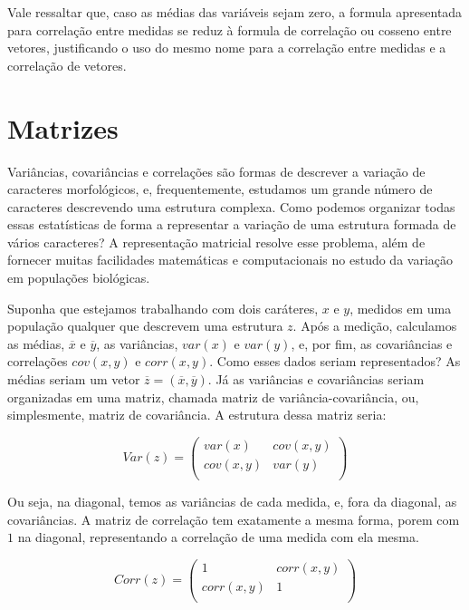 \documentclass[portuges,]{tufte-handout}
\begin{document}
Vale ressaltar que, caso as médias das variáveis sejam zero, a formula
apresentada para correlação entre medidas se reduz à formula de
correlação ou cosseno entre vetores, justificando o uso do mesmo nome
para a correlação entre medidas e a correlação de vetores.

\section{Matrizes}\label{matrizes}

Variâncias, covariâncias e correlações são formas de descrever a
variação de caracteres morfológicos, e, frequentemente, estudamos um
grande número de caracteres descrevendo uma estrutura complexa. Como
podemos organizar todas essas estatísticas de forma a representar a
variação de uma estrutura formada de vários caracteres? A representação
matricial resolve esse problema, além de fornecer muitas facilidades
matemáticas e computacionais no estudo da variação em populações
biológicas.

Suponha que estejamos trabalhando com dois caráteres, \(x\) e \(y\),
medidos em uma população qualquer que descrevem uma estrutura \(z\).
Após a medição, calculamos as médias, \(\overline x\) e \(\overline y\),
as variâncias, \(var(x)\) e \(var(y)\), e, por fim, as covariâncias e
correlações \(cov(x, y)\) e \(corr(x, y)\). Como esses dados seriam
representados? As médias seriam um vetor
\(\overline z = (\overline x, \overline y)\). Já as variâncias e
covariâncias seriam organizadas em uma matriz, chamada matriz de
variância-covariância, ou, simplesmente, matriz de covariância. A
estrutura dessa matriz seria:

\[
Var(z) = \left (
\begin{smallmatrix}
var(x) & cov(x, y) \\
cov(x,y) & var(y)  \\
\end{smallmatrix}
\right )
\]

Ou seja, na diagonal, temos as variâncias de cada medida, e, fora da
diagonal, as covariâncias. A matriz de correlação tem exatamente a mesma
forma, porem com \(1\) na diagonal, representando a correlação de uma
medida com ela mesma.

\[
Corr(z) = \left (
\begin{smallmatrix}
1 & corr(x, y) \\
corr(x,y) & 1  \\
\end{smallmatrix}
\right )
\]
\end{document}
